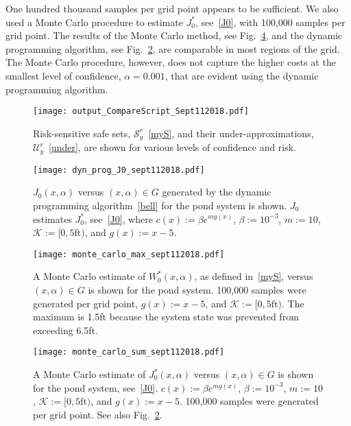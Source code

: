 \documentclass[letterpaper, 10 pt, conference]{ieeeconf}  %
\begin{document}
One hundred thousand samples per grid point appears to be sufficient. We also used a Monte Carlo procedure to estimate $J_0^*$, see~\eqref{J0},
with 100,000 samples per grid point.\footnotemark
{}
The results of the Monte Carlo method, see Fig.~\ref{J0mc}, and the dynamic programming algorithm, see Fig.~\ref{J0dp}, are comparable
in most regions of the grid. The Monte Carlo procedure, however, does not capture the higher costs at the smallest level of confidence, $\alpha = 0.001$,
that are evident using the dynamic programming algorithm.   

\begin{figure}[thpb]
      \centering
      \texttt{[image: output\_CompareScript\_Sept112018.pdf]}
      \caption{ Risk-sensitive safe sets, $\mathcal{S}_y^r$~\eqref{myS}, and their under-approximations, $\mathcal{U}_y^r$~\eqref{under},
		are shown for various levels of confidence and risk. } 
      \label{compare}
\end{figure}

\begin{figure}[thpb]
      \centering
      \texttt{[image: dyn\_prog\_J0\_sept112018.pdf]}
      \caption{$J_0(x,\alpha)$ versus $(x, \alpha) \in G$ generated by the dynamic programming algorithm~\eqref{bell} for the pond system is shown.
	  $J_0$ estimates $J_0^*$, see~\eqref{J0}, where $c(x) := \beta e^{m g(x)}$, $\beta := 10^{-3}$, $m := 10$, $\mathcal{K} := [0, 5\text{ft})$, and $g(x) := x-5$.}
      \label{J0dp}
\end{figure}

\begin{figure}[thpb]
      \centering
      \texttt{[image: monte\_carlo\_max\_sept112018.pdf]}
      \caption{A Monte Carlo estimate of $W_0^*(x,\alpha)$, as defined in~\eqref{myS}, versus $(x, \alpha) \in G$ is shown for the pond system.
	  100,000 samples were generated per grid point, $g(x) := x - 5$, and $\mathcal{K} := [0, 5\text{ft})$. 
	  The maximum is 1.5ft because the system state was prevented from exceeding 6.5ft.}
      \label{W0mc}
\end{figure}

\begin{figure}[thpb]
      \centering
      \texttt{[image: monte\_carlo\_sum\_sept112018.pdf]}
      \caption{A Monte Carlo estimate of $J_0^*(x,\alpha)$ versus $(x, \alpha) \in G$ is shown for the pond system, see~\eqref{J0}.
	  $c(x) := \beta e^{m g(x)}$, $\beta := 10^{-3}$, $m := 10$, $\mathcal{K} := [0, 5\text{ft})$, and $g(x) := x-5$.
	  100,000 samples were generated per grid point. See also Fig.~\ref{J0dp}.}
      \label{J0mc}
\end{figure}
\end{document}
